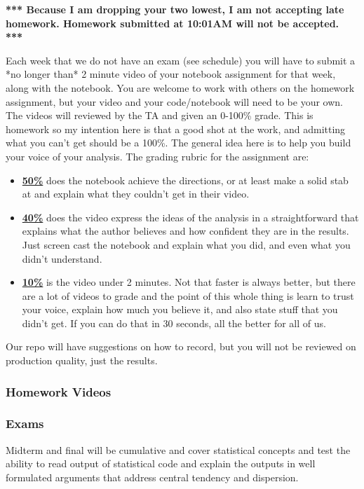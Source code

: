 \documentclass[11pt]{article}
\begin{document}
\textbf{*** Because I am dropping your two lowest, I am not accepting late homework. Homework submitted at 10:01AM will not be accepted. ***}


Each week that we do not have an exam (see schedule) you will have to submit a *no longer than* 2 minute video of your notebook assignment for that week, along with the notebook. You are welcome to work with others on the homework assignment, but your video and your code/notebook will need to be your own. The videos will reviewed by the TA and given an 0-100\% grade. This is homework so my intention here is that a good shot at the work, and admitting what you can't get should be a 100\%. The general idea here is to help you build your voice of your analysis. The grading rubric for the assignment are:
  \begin{itemize}
\item \underline{\textbf{50\%}} does the notebook achieve the directions, or at least make a solid stab at and explain what they couldn't get in their video.  
	\item \underline{\textbf{40\%}} does the video express the ideas of the analysis in a straightforward that explains what the author believes and how confident they are in the results. Just screen cast the notebook and explain what you did, and even what you didn't understand. 
\item \underline{\textbf{10\%}} is the video under 2 minutes. Not that faster is always better, but there are a lot of videos to grade and the point of this whole thing is learn to trust your voice, explain how much you believe it, and also state stuff that you didn't get. If you can do that in 30 seconds, all the better for all of us.   
\end{itemize}

Our repo will have suggestions on how to record, but you will not be reviewed on production quality, just the results. 

\subsubsection*{Homework Videos}

\subsubsection*{Exams}
Midterm and final will be cumulative and cover statistical concepts and test the ability to read output of statistical code and explain the outputs in well formulated arguments that address central tendency and dispersion.
\end{document}
